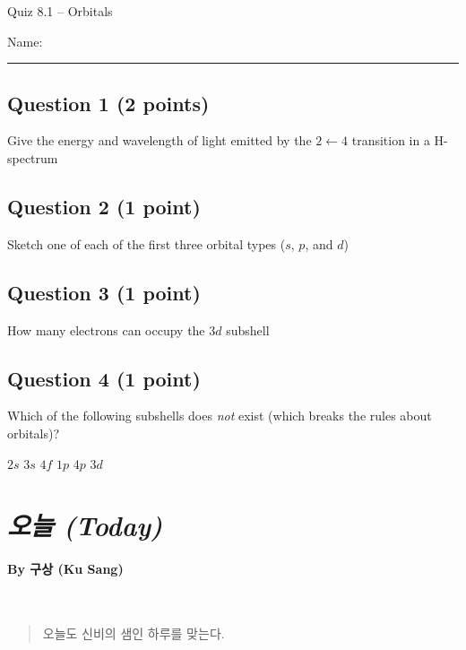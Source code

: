 \documentclass[11pt, letterpaper]{memoir}
\begin{document}
	\begin{center}
		{\large	Quiz 8.1 -- Orbitals}
	\end{center}
{\large Name: \rule[-1mm]{4in}{.1pt}
	
	\subsection*{Question 1 (2 points)}
	Give the energy and wavelength of light emitted by the $2\leftarrow4$ transition in a H-spectrum
	
	\vspace{10em}
	\subsection*{Question 2 (1 point)}
	Sketch one of each of the first three orbital types ($s$, $p$, and $d$)

	\vspace{10em}
	\subsection*{Question 3 (1 point)}
	How many electrons can occupy the $3d$ subshell
	
	\vspace{8em}
	\subsection*{Question 4 (1 point)}
	Which of the following subshells does \emph{not} exist (which breaks the rules about orbitals)?
	
	{\large $2s$ \hspace{3em} $3s$ \hspace{3em} $4f$ \hspace{3em} $1p$ \hspace{3em} $4p$ \hspace{3em} $3d$}
	
\newpage
\pagestyle{empty}
\addtocounter{page}{-1}
\section*{\emph{{오늘} (Today)}}
\paragraph{By {구상} (Ku Sang)}~

{
\begin{verse}
	오늘도 신비의 샘인 하루를 맞는다.


\end{verse}}}
\end{document}
